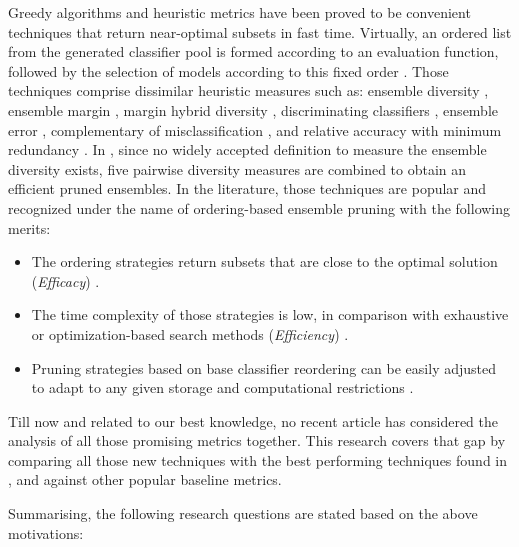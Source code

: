Greedy algorithms and heuristic metrics have been proved to be convenient techniques that return near-optimal subsets in fast time. Virtually, an ordered list from the generated classifier pool is formed according to an evaluation function, followed by the selection of models according to this fixed order \cite{cao2018}. Those techniques comprise dissimilar heuristic measures such as: ensemble diversity \cite{lu2010}, ensemble margin \cite{martinez2004,guo2013}, margin hybrid diversity \cite{guo2018}, discriminating classifiers \cite{cao2018}, ensemble error \cite{margineantu1997}, complementary of misclassification \cite{martinez2004}, and relative accuracy with minimum redundancy \cite{cao2018}. In \cite{cavalcanti2016}, since no widely accepted definition to measure the ensemble diversity exists, five pairwise diversity measures are combined to obtain an efficient pruned ensembles. In the literature, those techniques are popular and recognized under the name of ordering-based ensemble pruning with the following merits: 
\begin{itemize} [nosep]
    \item The ordering strategies return subsets that are close to the optimal solution (\textit{Efficacy}) \cite{martinez2009}.
    \item The time complexity of those strategies is low, in comparison with exhaustive or optimization-based search methods (\textit{Efficiency}) \cite{martinez2009}.
    \item Pruning strategies based on base classifier reordering can be easily adjusted to adapt to any given storage and computational restrictions \cite{cao2018,guo2018}.
\end{itemize}


Till now and related to our best knowledge, no recent article has considered the analysis of all those promising metrics together. This research covers that gap by comparing all those new techniques with the best performing techniques found in \cite{martinez2009}, and against other popular baseline metrics. 


Summarising, the following research questions are stated based on the above motivations:


